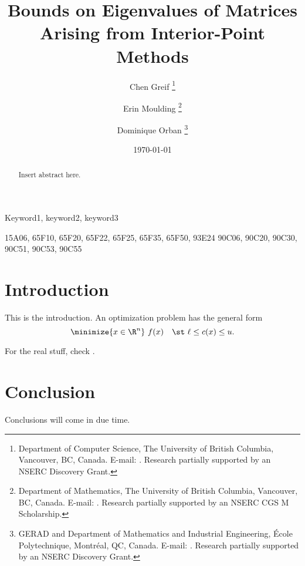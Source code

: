 \documentclass[review]{siamart190516}   %
\title{
  Bounds on Eigenvalues of Matrices Arising from Interior-Point Methods%
}
\author{
  Chen Greif%
  \thanks{%
    Department of Computer Science,
    The University of British Columbia,
    Vancouver, BC, Canada.
    E-mail: \mailto{greif@cs.ubc.ca}.
    Research partially supported by an NSERC Discovery Grant.
  }
  \and
  Erin Moulding%
  \thanks{%
    Department of Mathematics,
    The University of British Columbia,
    Vancouver, BC, Canada.
    E-mail: \mailto{moulding@math.ubc.ca}.
    Research partially supported by an NSERC CGS M Scholarship.
  }
  \and
  Dominique Orban%
  \thanks{%
    GERAD and Department of Mathematics and Industrial Engineering,
    \'Ecole Polytechnique, Montr\'eal, QC, Canada.
    E-mail: \mailto{dominique.orban@gerad.ca}.
    Research partially supported by an NSERC Discovery Grant.
  }
}
\date{\today}
\begin{document}
  \linenumbers
  \maketitle

  \thispagestyle{firstpage}
  \pagestyle{myheadings}

  \begin{abstract}
    Insert abstract here. 
  \end{abstract}

  \begin{keywords}
    Keyword1, keyword2, keyword3
  \end{keywords}

  \begin{AMS}
    15A06,  %
    65F10,  %
    65F20,  %
    65F22,  %
    65F25,  %
    65F35,  %
    65F50,  %
    93E24   %
    90C06,  %
    90C20,  %
    90C30,  %
    90C51,  %
    90C53,  %
    90C55   %
  \end{AMS}

  \tableofcontents
  \listoftodos\relax

  \section{Introduction}

  This is the introduction. An optimization problem has the general form
  \begin{equation}
    \label{eq:opt-problem}
    \minimize{x \in \R^n} \ f(x) \quad \st \ \ell \leq c(x) \leq u.
  \end{equation}

  For the real stuff, check \cite{wright-orban-2002}.

  \section{Conclusion}

  Conclusions will come in due time. 

  
  
\end{document}
